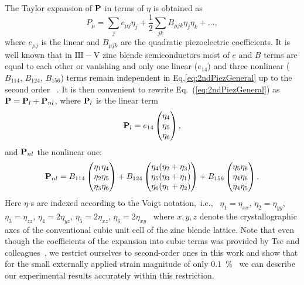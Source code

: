 \documentclass[aps,prl,amsmath,amssymb,twocolumn,showpacs,showkeys,superscriptaddress]{revtex4-1}
\begin{document}
The Taylor expansion of ${\bf P}$ in terms of $\eta$ is obtained as
%
\begin{equation}
\label{eq:2ndPiezGeneral}
P_{\mu}=\sum_je_{\mu j}\eta_j+\frac{1}{2}\sum_{jk}B_{\mu jk}\eta_j\eta_k+\dots,
\end{equation}
%
where $e_{\mu j}$ is the linear and $B_{\mu jk}$ are the quadratic piezoelectric coefficients. It is well known that in $\mathrm{III-V}$ zinc blende semiconductors most of $e$ and $B$ terms are equal to each other or vanishing and only one linear ($e_{14}$) and three nonlinear ($B_{114}$, $B_{124}$, $B_{156}$) terms remain independent in Eq.\ref{eq:2ndPiezGeneral} up to the second order ~\cite{Beya-Wakata2011}. It is then convenient to rewrite Eq.~(\ref{eq:2ndPiezGeneral}) as ${\bf P}={\bf P}_{l}+{\bf P}_{nl}$, where ${\bf P}_{l}$ is the linear term
%
%
\begin{equation}
\label{eq:1stPiez}
{\bf P}_{l}=e_{14}\begin{pmatrix}\eta_4\\\eta_5\\\eta_6\end{pmatrix},
\end{equation}
%
and ${\bf P}_{nl}$ the nonlinear one:
%
\begin{equation}
\label{eq:2ndPiez}
{\bf P}_{nl}=B_{114}\begin{pmatrix}\eta_1\eta_4\\\eta_2\eta_5\\\eta_3\eta_6\end{pmatrix}+
B_{124}\begin{pmatrix}\eta_4(\eta_2+\eta_3)\\\eta_5(\eta_3+\eta_1)\\\eta_6(\eta_1+\eta_2)\end{pmatrix}+
B_{156}\begin{pmatrix}\eta_5\eta_6\\\eta_4\eta_6\\\eta_4\eta_5\end{pmatrix}.
\end{equation}
%
%
Here $\eta$-s are indexed according to the Voigt notation,~i.e.,~ $\eta_1=\eta_{xx}$, $\eta_2=\eta_{yy}$, $\eta_3=\eta_{zz}$, $\eta_4=2\eta_{yz}$, $\eta_5=2\eta_{xz}$, $\eta_6=2\eta_{xy}$~\cite{Beya-Wakata2011} where $x,y,z$ denote the crystallographic axes of the conventional cubic unit cell of the zinc blende lattice.
%
%
Note that even though the coefficients of the expansion into cubic
terms was provided by Tse and colleagues~\cite{Tse2013}, we restrict ourselves to second-order ones in this work and show that for the small externally applied strain magnitude of only 0.1~\%~\cite{Aberl:17} we can describe our experimental results accurately within this restriction. 
\end{document}

